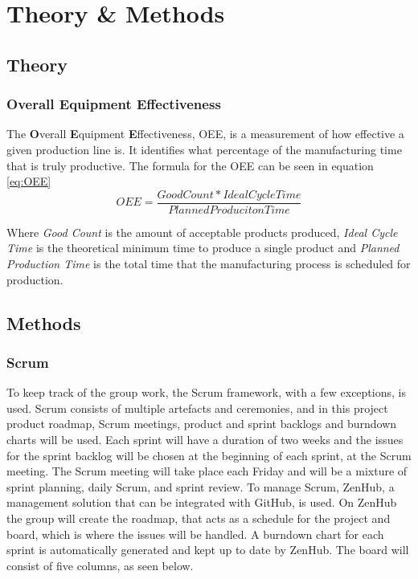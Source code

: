 \section{Theory \& Methods}
\subsection{Theory}

\subsubsection{Overall Equipment Effectiveness}
The \textbf{O}verall \textbf{E}quipment \textbf{E}ffectiveness, OEE, is a
measurement of how effective a given production line is. It identifies what
percentage of the manufacturing time that is truly productive. The formula for
the OEE can be seen in equation \ref{eq:OEE}
\begin{equation} \label{eq:OEE}
    OEE = \frac{Good Count * Ideal Cycle Time}{Planned Produciton Time}
\end{equation}

Where \textit{Good Count} is the amount of acceptable products produced,
\textit{Ideal Cycle Time} is the theoretical minimum time to produce a single
product and \textit{Planned Production Time} is the total time that the
manufacturing process is scheduled for production.

\subsection{Methods}
\subsubsection{Scrum}
To keep track of the group work, the Scrum framework, with a few exceptions, is
used. Scrum consists of multiple artefacts and ceremonies, and in this project
product roadmap, Scrum meetings, product and sprint backlogs and burndown charts
will be used. Each sprint will have a duration of two weeks and the issues for
the sprint backlog will be chosen at the beginning of each sprint, at the Scrum
meeting. The Scrum meeting will take place each Friday and will be a mixture of
sprint planning, daily Scrum, and sprint review. To manage Scrum, ZenHub, a
management solution that can be integrated with GitHub, is used. On ZenHub the
group will create the roadmap, that acts as a schedule for the project and
board, which is where the issues will be handled. A burndown chart for each
sprint is automatically generated and kept up to date by ZenHub. The board will
consist of five columns, as seen below.


